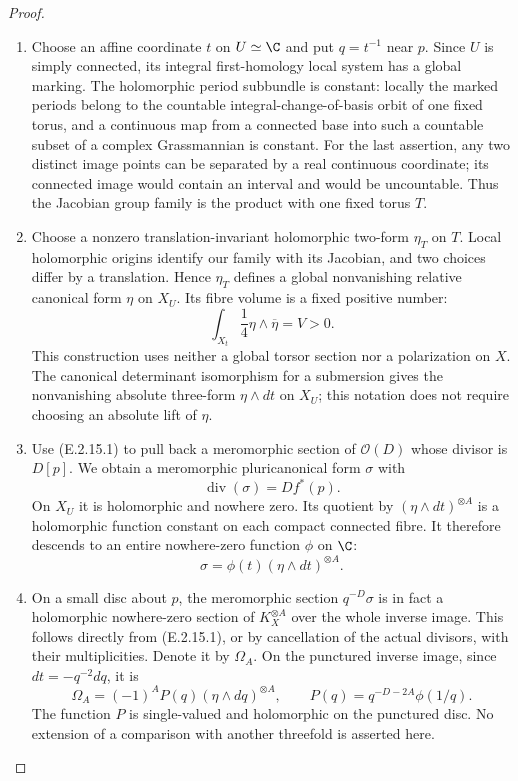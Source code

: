\begin{proof}

\begin{enumerate}[label={$\langle1\rangle$\arabic*.},leftmargin=*]
\item Choose an affine coordinate $t$ on $U\simeq\C$ and put
$q=t^{-1}$ near $p$.  Since $U$ is simply connected, its
integral first-homology local system has a global marking.
The holomorphic period subbundle is constant: locally the
marked periods belong to the countable integral-change-of-basis
orbit of one fixed torus, and a continuous map from a connected
base into such a countable subset of a complex Grassmannian
is constant.  For the last assertion, any two distinct image
points can be separated by a real continuous coordinate;
its connected image would contain an interval and would be
uncountable.  Thus the Jacobian group family is the product
with one fixed torus $T$.

\item Choose a nonzero translation-invariant holomorphic two-form
$\eta_T$ on $T$.  Local holomorphic origins identify our
family with its Jacobian, and two choices differ by a
translation.  Hence $\eta_T$ defines a global nonvanishing
relative canonical form $\eta$ on $X_U$.  Its fibre volume
is a fixed positive number:
\[
 \int_{X_t}\frac14\eta\wedge\overline\eta=V>0.
 \tag{E.2.15.2}
\]
This construction uses neither a global torsor section nor
a polarization on $X$.  The canonical determinant
isomorphism for a submersion gives the nonvanishing
absolute three-form $\eta\wedge dt$ on $X_U$; this notation
does not require choosing an absolute lift of $\eta$.

\item Use (E.2.15.1) to pull back a meromorphic section of
$\mathcal O(D)$ whose divisor is $D[p]$.  We obtain a
meromorphic pluricanonical form $\sigma$ with
\[
 \operatorname{div}(\sigma)=D f^*(p).
\]
On $X_U$ it is holomorphic and nowhere zero.  Its quotient
by $(\eta\wedge dt)^{\otimes A}$ is a holomorphic function
constant on each compact connected fibre.  It therefore
descends to an entire nowhere-zero function $\phi$ on $\C$:
\[
 \sigma=\phi(t)(\eta\wedge dt)^{\otimes A}.
 \tag{E.2.15.3}
\]

\item On a small disc about $p$, the meromorphic section
$q^{-D}\sigma$ is in fact a holomorphic nowhere-zero section
of $K_X^{\otimes A}$ over the whole inverse image.  This
follows directly from (E.2.15.1), or by cancellation of the
actual divisors, with their multiplicities.  Denote it by
$\Omega_A$.  On the punctured inverse image, since
$dt=-q^{-2}dq$, it is
\[
 \Omega_A=(-1)^A P(q)(\eta\wedge dq)^{\otimes A},
 \qquad P(q)=q^{-D-2A}\phi(1/q).
 \tag{E.2.15.4}
\]
The function $P$ is single-valued and holomorphic on the
punctured disc.  No extension of a comparison with another
threefold is asserted here.


\end{enumerate}
\end{proof}
